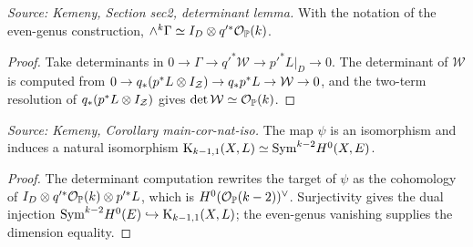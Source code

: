 \begin{lemma}
  \label{lem:kemeny_even_det_gamma}
  \textit{Source: Kemeny, Section sec2, determinant lemma.}
  With the notation of the even-genus construction,
  \(\wedge^k\Gamma\simeq I_D\otimes q'^*\mathcal{O}_{\mathbb{P}}(k)\).
\end{lemma}
\begin{proof}
  Take determinants in
  \(0\to\Gamma\to q'^*\mathcal W\to p'^*L|_D\to0\).  The determinant of
  \(\mathcal W\) is computed from
  \(0\to q_*(p^*L\otimes I_{\mathcal{Z}})\to q_*p^*L\to\mathcal W\to0\), and the
  two-term resolution of \(q_*(p^*L\otimes I_{\mathcal{Z}})\) gives
  \(\det\mathcal W\simeq \mathcal{O}_{\mathbb{P}}(k)\).
\end{proof}

\begin{corollary}
  \label{cor:kemeny_extremal_syzygy_iso}
  \textit{Source: Kemeny, Corollary main-cor-nat-iso.}
  The map \(\psi\) is an isomorphism and induces a natural isomorphism
  \(\mathrm{K}_{k-1,1}(X,L)\simeq \mathrm{Sym}^{k-2}H^0(X,E)\).
\end{corollary}
\begin{proof}
  The determinant computation rewrites the target of \(\psi\) as the cohomology
  of \(I_D\otimes q'^*\mathcal{O}_{\mathbb{P}}(k)\otimes p'^*L\), which is
  \(H^0(\mathcal{O}_{\mathbb{P}}(k-2))^\vee\).  Surjectivity gives the dual injection
  \(\mathrm{Sym}^{k-2}H^0(E)\hookrightarrow \mathrm{K}_{k-1,1}(X,L)\); the even-genus vanishing
  supplies the dimension equality.
\end{proof}

